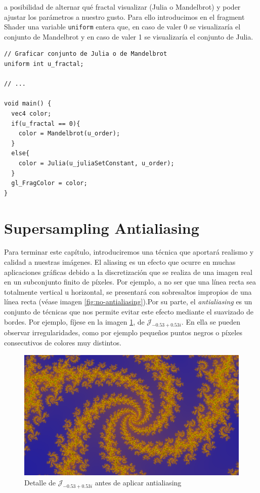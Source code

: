 a posibilidad de alternar qué fractal visualizar (Julia o Mandelbrot) y poder ajustar los parámetros a nuestro gusto. Para ello introducimos en el fragment Shader una variable \verb|uniform| entera que, en caso de valer 0 se visualizaría el conjunto de Mandelbrot y en caso de valer 1 se visualizaría el conjunto de Julia.

\begin{lstlisting}
// Graficar conjunto de Julia o de Mandelbrot
uniform int u_fractal;

// ... 

void main() {
  vec4 color;
  if(u_fractal == 0){
    color = Mandelbrot(u_order);
  }
  else{
    color = Julia(u_juliaSetConstant, u_order);
  }
  gl_FragColor = color;
}
\end{lstlisting}

\section{Supersampling Antialiasing}

Para terminar este capítulo, introduciremos una técnica que aportará realismo y calidad a nuestras imágenes. El aliasing es un efecto que ocurre en muchas aplicaciones gráficas debido a la discretización que se realiza de una imagen real en un subconjunto finito de píxeles. Por ejemplo, a no ser que una línea recta sea totalmente vertical u horizontal, se presentará con sobresaltos impropios de una línea recta (véase imagen \ref{fig:no-antialiasing}).Por su parte, el \textit{antialiasing} es un conjunto de técnicas que nos permite evitar este efecto mediante el suavizado de bordes. Por ejemplo, fíjese en la imagen \ref{fig:no-antialiasing-2D}, de $\mathcal{J}_{-0.53 + 0.53i}$. En ella se pueden observar irregularidades, como por ejemplo pequeños puntos negros o píxeles consecutivos de colores muy distintos.

\begin{figure} [ht]
  \centering
  \includegraphics[width=130mm]{img/C6/no-antialiasing.png}
  \caption{Detalle de $\mathcal{J}_{-0.53 + 0.53i}$ antes de aplicar antialiasing}
  \label{fig:no-antialiasing-2D}
\end{figure}

